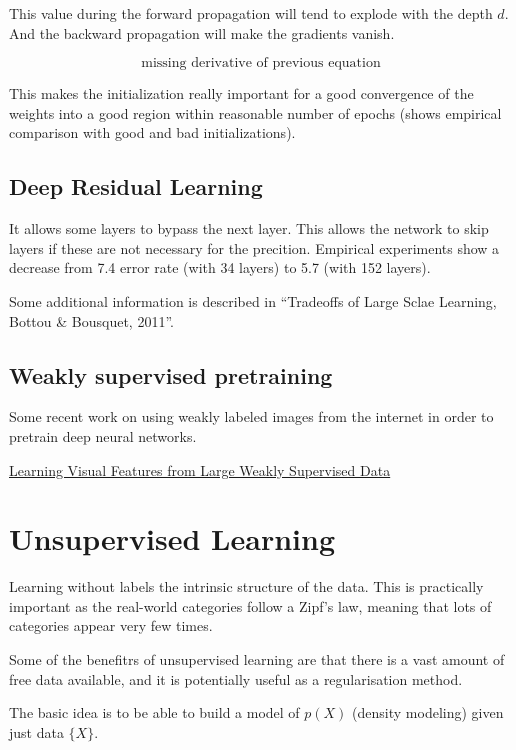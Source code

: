 \documentclass[b5paper]{report}
\begin{document}
This value during the forward propagation will tend to explode with the depth
$d$. And the backward propagation will make the gradients vanish.

\begin{equation}
  \text{missing derivative of previous equation}
\end{equation}

This makes the initialization really important for a good convergence of the
weights into a good region within reasonable number of epochs (shows empirical
comparison with good and bad initializations).

\subsection{Deep Residual Learning}

It allows some layers to bypass the next layer. This allows the network to skip
layers if these are not necessary for the precition. Empirical experiments show
a decrease from 7.4 error rate (with 34 layers) to 5.7 (with 152 layers).

Some additional information is described in ``Tradeoffs of Large Sclae
Learning, Bottou \& Bousquet, 2011''.


\subsection{Weakly supervised pretraining}

Some recent work on using weakly labeled images from the internet in order to
pretrain deep neural networks.

\href{https://arxiv.org/abs/1511.02251}{Learning Visual Features from Large
Weakly Supervised Data} \cite{Joulin2015}

\section{Unsupervised Learning}

Learning without labels the intrinsic structure of the data. This is
practically important as the real-world categories follow a Zipf's law, meaning
that lots of categories appear very few times.

Some of the benefitrs of unsupervised learning are that there is a vast amount
of free data available, and it is potentially useful as a regularisation
method.

The basic idea is to be able to build a model of $p(X)$ (density modeling)
given just data $\{X\}$.
\end{document}
